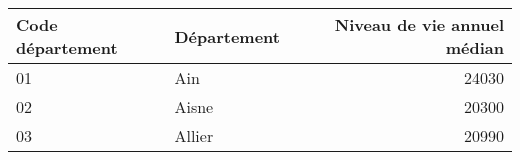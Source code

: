 \begin{tabular}{llr}
\toprule
\textbf{Code département} & \textbf{Département} &  \textbf{Niveau de vie annuel médian} \\
\midrule
01               &         Ain &                        24030 \\
02               &       Aisne &                        20300 \\
03               &      Allier &                        20990 \\
\bottomrule
\end{tabular}
